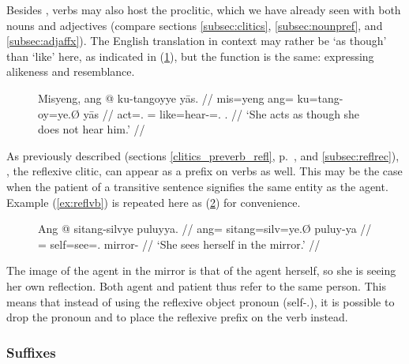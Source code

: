 Besides , verbs may also host the 
proclitic, which we have already seen with both nouns and adjectives (compare
sections \ref{subsec:clitics}, \ref{subsec:nounpref}, and
\ref{subsec:adjaffx}). The English translation in context may rather be `as
though' than `like' here, as indicated in (\ref{ex:likecompl}), but the
function is the same: expressing alikeness and resemblance.

\begin{figure}[h]
\ex\label{ex:likecompl}\begingl
	\gla Misyeng, ang @ ku-tangoyye yās. //
	\glb mis=yeng ang= ku=tang-oy=ye.Ø yās //
	\glc act=\TsgF{}.\Aarg{} \AgtT{}= like=hear-\Neg{}=\TsgF{}.\Top{} 
		\TsgM{}.\Parg{} //
	\glft `She acts as though she does not hear him.' //
\endgl\xe
\end{figure}

As previously described (sections \ref{clitics_preverb_refl},
p.~\pageref{clitics_preverb_refl}, and \ref{subsec:reflrec}),
, the reflexive clitic, can appear as a prefix on
verbs as well. This may be the case when the patient of a transitive sentence
signifies the same entity as the agent. Example (\ref{ex:reflvb}) is repeated
here as (\ref{ex:reflvb_2}) for convenience.

\begin{figure}[h]
\ex\label{ex:reflvb_2}\begingl
	\gla Ang @ sitang-silvye puluyya. //
	\glb ang= sitang=silv=ye.Ø puluy-ya //
	\glc \AgtT{}= self=see=\TsgF{}.\Top{} mirror-\Loc{} //
	\glft `She sees herself in the mirror.' //
\endgl\xe
\end{figure}

The image of the agent in the mirror is that of the agent herself, so she is
seeing her own reflection. Both agent and patient thus refer to the same
person. This means that instead of using the reflexive object pronoun
 (self-\TsgF{}.\Parg{}), it is possible
to drop the pronoun and to place the reflexive prefix on the verb instead.


\subsubsection{Suffixes}

